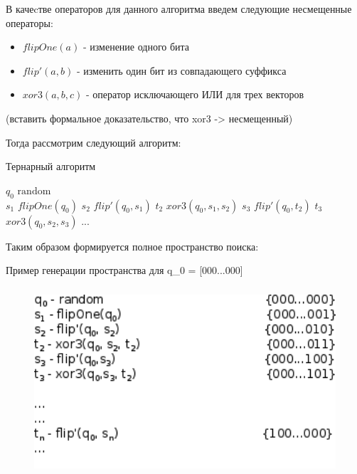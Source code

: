 \label{ternary}



В качеcтве операторов для данного алгоритма введем следующие несмещенные операторы: 
\begin{itemize}
   \item $flipOne(a)$ - изменение одного бита
   \item $flip'(a, b)$ - изменить один бит из совпадающего суффикса
   \item $xor3(a,b,c)$ - оператор исключающего ИЛИ для трех векторов 
\end{itemize}

(вставить формальное доказательство, что xor3 -> несмещенный)

Тогда рассмотрим следующий алгоритм: 
\begin{algorithm}[H]
\caption{Тернарный алгоритм}\label{lst1}
\begin{algorithmic}
        \State $q_0$ \leftarrow $\textrm{random}$ \\
        \State $s_1$ \leftarrow $flipOne(q_0)$
	        \State $s_2$ \leftarrow $flip'(q_0, s_1)$
            \State $t_2$ \leftarrow $xor3(q_0,s_1,s_2)$
            \State $s_3$ \leftarrow $flip'(q_0, t_2)$
            \State $t_3$ \leftarrow $xor3(q_0,s_2,s_3)$
            \State ...
		\EndWhile
\end{algorithmic}
\end{algorithm}

Таким образом формируется полное пространство поиска: 
\begin{example}
Пример генерации пространства для q_0 = [000...000]  \\
\end{example}

\begin{figure}[H]
    \includegraphics[height=7cm]{ITMO/pic/tern0.png}
\end{figure}


